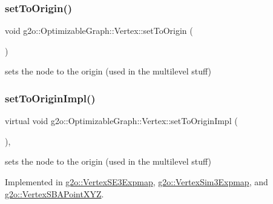 \subsubsection{\texorpdfstring{set\+To\+Origin()}{setToOrigin()}}
{\footnotesize\ttfamily void g2o\+::\+Optimizable\+Graph\+::\+Vertex\+::set\+To\+Origin (\begin{DoxyParamCaption}{ }\end{DoxyParamCaption})\hspace{0.3cm}{\ttfamily [inline]}}



sets the node to the origin (used in the multilevel stuff) 

\mbox{\label{classg2o_1_1_optimizable_graph_1_1_vertex_abd5fe36815f27a9c174ad41c2070c247}} 
\subsubsection{\texorpdfstring{set\+To\+Origin\+Impl()}{setToOriginImpl()}}
{\footnotesize\ttfamily virtual void g2o\+::\+Optimizable\+Graph\+::\+Vertex\+::set\+To\+Origin\+Impl (\begin{DoxyParamCaption}{ }\end{DoxyParamCaption})\hspace{0.3cm}{\ttfamily [protected]}, {}}



sets the node to the origin (used in the multilevel stuff) 



Implemented in \mbox{\hyperlink{classg2o_1_1_vertex_s_e3_expmap_a0d12948c1fb058698bc58177db3806b1}{g2o\+::\+Vertex\+S\+E3\+Expmap}}, \mbox{\hyperlink{classg2o_1_1_vertex_sim3_expmap_ab076d5964ab55f95251a75bcf341ce05}{g2o\+::\+Vertex\+Sim3\+Expmap}}, and \mbox{\hyperlink{classg2o_1_1_vertex_s_b_a_point_x_y_z_a787b72465f35a3f30fcbb6b8056b47c4}{g2o\+::\+Vertex\+S\+B\+A\+Point\+X\+YZ}}.

\mbox{\label{classg2o_1_1_optimizable_graph_1_1_vertex_a858d15a4fadebfc8bce0162ac675f608}} 
